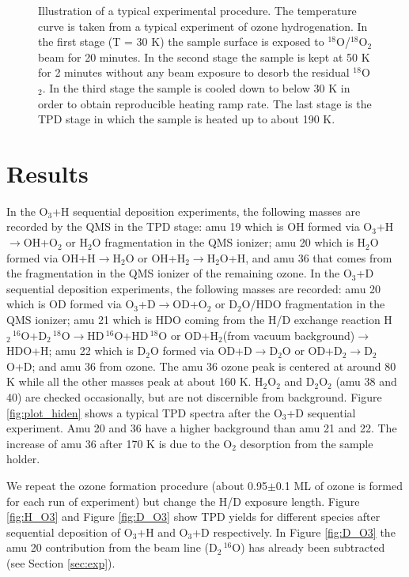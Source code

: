 \documentclass[iop]{emulateapj}
\begin{document}
\begin{figure}
\caption{Illustration of a typical experimental procedure. The temperature curve is taken from a typical experiment of ozone hydrogenation. In the first stage (T = 30 K) the sample surface is exposed to $^{18}$O/$^{18}$O$_2$ beam for 20 minutes. In the second stage the sample is kept at 50 K for 2 minutes without any beam exposure to desorb the residual $^{18}$O$_2$. In the third stage the sample is cooled down to below 30 K in order to obtain reproducible heating ramp rate. The last stage is the TPD stage in which the sample is heated up to about 190 K. }
\label{fig:exp_procedure}
\end{figure}


\section{Results}
\label{sec:results}
In the O$_3$+H sequential deposition experiments, the following masses are recorded by the QMS in the TPD stage: amu 19 which is  OH formed via O$_3$+H$\rightarrow$OH+O$_2$ or H$_2$O fragmentation in the QMS ionizer; amu 20 which is  H$_2$O formed via OH+H$\rightarrow$H$_2$O or OH+H$_2\rightarrow$H$_2$O+H, and amu 36 that comes from the fragmentation in the QMS ionizer of the remaining ozone. In the O$_3$+D sequential deposition experiments, the following masses are recorded: amu 20 which is OD formed via O$_3$+D$\rightarrow$OD+O$_2$ or D$_2$O/HDO fragmentation in the QMS ionizer; amu 21 which is HDO coming from the H/D exchange reaction H$_2\,^{16}$O+D$_2\,^{18}$O$\rightarrow$HD\,$^{16}$O+HD\,$^{18}$O or OD+H$_2$(from vacuum background)$\rightarrow$HDO+H; amu 22 which is D$_2$O formed via OD+D$\rightarrow$D$_2$O or OD+D$_2\rightarrow$D$_2$O+D; and amu 36 from  ozone. The amu 36 ozone peak is centered at around 80 K while all the other masses peak at about 160 K. H$_2$O$_2$ and D$_2$O$_2$ (amu 38 and 40) are checked occasionally, but are not discernible from background. Figure \ref{fig:plot_hiden} shows a typical TPD spectra after the O$_3$+D sequential experiment. Amu 20 and 36 have a higher background than amu 21 and 22. The increase of amu 36 after 170 K is due to the O$_2$ desorption from the sample holder. 

We repeat the ozone formation procedure (about 0.95$\pm$0.1 ML of ozone is formed for each run of experiment) but change the H/D exposure length. Figure \ref{fig:H_O3} and Figure \ref{fig:D_O3} show TPD yields for different species after sequential deposition of O$_3$+H and O$_3$+D respectively. In Figure \ref{fig:D_O3} the amu 20 contribution from the beam line (D$_2\,^{16}$O) has already been subtracted (see Section \ref{sec:exp}). 
\end{document}
